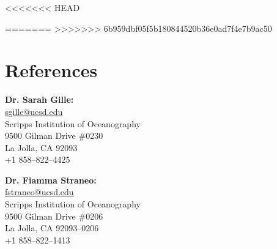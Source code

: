 \documentclass[10pt]{article}
\begin{document}
<<<<<<< HEAD

=======
>>>>>>> 6b959dbf05f5b180844520b36e0ad7f4e7b9ac50
\vspace{.5cm}
\section*{References}
\vspace{.3cm}

\begin{minipage}[ht]{0.48\textwidth}
\begin{flushleft}
\textbf{Dr. Sarah Gille:} \\
\vspace{.1cm}
\url{sgille@ucsd.edu}\\
\vspace{.2cm}
\small{Scripps Institution of Oceanography}\\
\small{9500 Gilman Drive \#0230} \\
\small{La Jolla, CA 92093} \\
\small{+1 858--822--4425} 
\end{flushleft}
\end{minipage}
\hfill
\begin{minipage}[ht]{0.48\textwidth}
\begin{flushright}
\textbf{Dr. Fiamma Straneo:} \\
\vspace{.1cm}
\url{fstraneo@ucsd.edu}\\
\vspace{.2cm}
\small{Scripps Institution of Oceanography}\\
\small{9500 Gilman Drive \#0206} \\
\small{La Jolla, CA 92093--0206} \\
\small{+1 858--822--1413} 
\end{flushright}
\end{minipage}
\hfill
\end{document}
